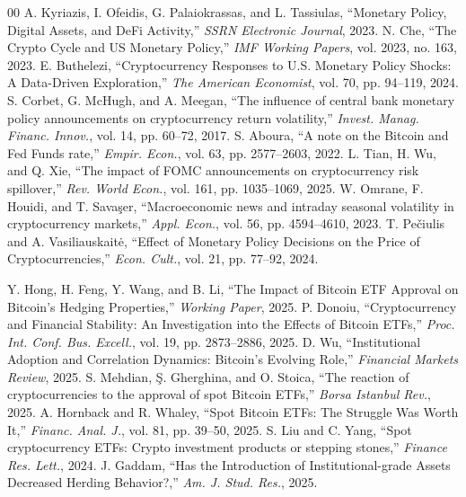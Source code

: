 \documentclass[10pt, conference, compsocconf]{IEEEtran}
\begin{document}
\begin{thebibliography}{00}
 A. Kyriazis, I. Ofeidis, G. Palaiokrassas, and L. Tassiulas, ``Monetary Policy, Digital Assets, and DeFi Activity,'' \textit{SSRN Electronic Journal}, 2023.
 N. Che, ``The Crypto Cycle and US Monetary Policy,'' \textit{IMF Working Papers}, vol. 2023, no. 163, 2023.
 E. Buthelezi, ``Cryptocurrency Responses to U.S. Monetary Policy Shocks: A Data-Driven Exploration,'' \textit{The American Economist}, vol. 70, pp. 94--119, 2024.
 S. Corbet, G. McHugh, and A. Meegan, ``The influence of central bank monetary policy announcements on cryptocurrency return volatility,'' \textit{Invest. Manag. Financ. Innov.}, vol. 14, pp. 60--72, 2017.
 S. Aboura, ``A note on the Bitcoin and Fed Funds rate,'' \textit{Empir. Econ.}, vol. 63, pp. 2577--2603, 2022.
 L. Tian, H. Wu, and Q. Xie, ``The impact of FOMC announcements on cryptocurrency risk spillover,'' \textit{Rev. World Econ.}, vol. 161, pp. 1035--1069, 2025.
 W. Omrane, F. Houidi, and T. Savaşer, ``Macroeconomic news and intraday seasonal volatility in cryptocurrency markets,'' \textit{Appl. Econ.}, vol. 56, pp. 4594--4610, 2023.
 T. Pečiulis and A. Vasiliauskaitė, ``Effect of Monetary Policy Decisions on the Price of Cryptocurrencies,'' \textit{Econ. Cult.}, vol. 21, pp. 77--92, 2024.

 Y. Hong, H. Feng, Y. Wang, and B. Li, ``The Impact of Bitcoin ETF Approval on Bitcoin's Hedging Properties,'' \textit{Working Paper}, 2025.
 P. Donoiu, ``Cryptocurrency and Financial Stability: An Investigation into the Effects of Bitcoin ETFs,'' \textit{Proc. Int. Conf. Bus. Excell.}, vol. 19, pp. 2873--2886, 2025.
 D. Wu, ``Institutional Adoption and Correlation Dynamics: Bitcoin's Evolving Role,'' \textit{Financial Markets Review}, 2025.
 S. Mehdian, Ş. Gherghina, and O. Stoica, ``The reaction of cryptocurrencies to the approval of spot Bitcoin ETFs,'' \textit{Borsa Istanbul Rev.}, 2025.
 A. Hornback and R. Whaley, ``Spot Bitcoin ETFs: The Struggle Was Worth It,'' \textit{Financ. Anal. J.}, vol. 81, pp. 39--50, 2025.
 S. Liu and C. Yang, ``Spot cryptocurrency ETFs: Crypto investment products or stepping stones,'' \textit{Finance Res. Lett.}, 2024.
 J. Gaddam, ``Has the Introduction of Institutional-grade Assets Decreased Herding Behavior?,'' \textit{Am. J. Stud. Res.}, 2025.


\end{thebibliography}
\end{document}
